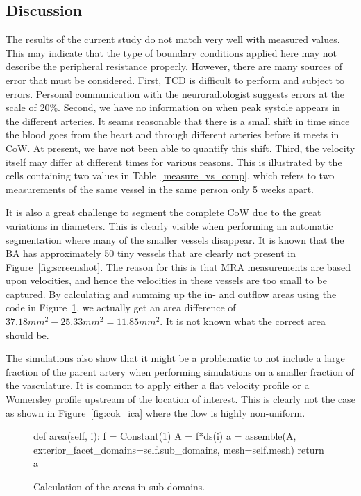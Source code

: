 \subsection{Discussion}

The results of the current study do not match very well with measured
values. This may indicate that the type of boundary conditions applied
here may not describe the peripheral resistance properly. However,
there are many sources of error that must be considered.  First, TCD
is difficult to perform and subject to errors. Personal communication
with the neuroradiologist suggests errors at the scale of 20\%.
Second, we have no information on when peak systole appears in the
different arteries. It seams reasonable that there is a small shift in
time since the blood goes from the heart and through different
arteries before it meets in CoW. At present, we have not been able to
quantify this shift. Third, the velocity itself may differ at
different times for various reasons. This is illustrated by the cells
containing two values in Table~\ref{measure_vs_comp}, which refers to
two measurements of the same vessel in the same person only 5 weeks
apart.

It is also a great challenge to segment the complete CoW due to the
great variations in diameters. This is clearly visible when performing
an automatic segmentation where many of the smaller vessels disappear.
It is known that the BA has approximately 50 tiny vessels that are
clearly not present in Figure~\ref{fig:screenshot}. The reason for
this is that MRA measurements are based upon velocities, and hence the
velocities in these vessels are too small to be captured. By
calculating and summing up the in- and outflow areas using the code in
Figure~\ref{fig:area_code}, we actually get an area difference of
$37.18mm^2-25.33mm^2=11.85mm^2$. It is not known what the correct area
should be.

The simulations also show that it might be a problematic to not
include a large fraction of the parent artery when performing
simulations on a smaller fraction of the vasculature. It is common to
apply either a flat velocity profile or a Womersley profile upstream
of the location of interest. This is clearly not the case as shown in
Figure~\ref{fig:cok_ica} where the flow is highly non-uniform.

\begin{figure}
  \begin{center}
    \begin{python}
def area(self, i):
    f = Constant(1)
    A = f*ds(i)
    a = assemble(A, exterior_facet_domains=self.sub_domains, mesh=self.mesh)
    return a
    \end{python}
    \caption{Calculation of the areas in sub domains.}
    \label{fig:area_code}
  \end{center}
\end{figure}

